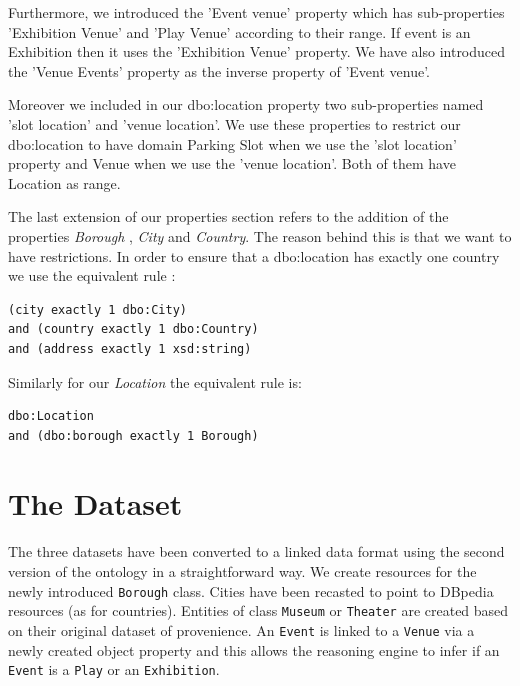 \documentclass[runningheads,a4paper]{../../StyleFiles/llncs}
\begin{document}
Furthermore, we introduced the 'Event venue' property which has sub-properties 'Exhibition Venue' and 'Play Venue' according to their range. If event is an Exhibition then it uses the 'Exhibition Venue' property. We have also introduced the 'Venue Events' property as the inverse property of 'Event venue'. 

Moreover we included in our dbo:location property two sub-properties named 'slot location' and 'venue location'. We use these properties to restrict our dbo:location to have domain Parking Slot when we use the 'slot location' property and Venue when we use the 'venue location'. Both of them have Location as range.

The last extension of our properties section refers to the addition of the properties \textit{Borough} , \textit{City} and \textit{Country}. The reason behind this is that we want to have restrictions. In order to ensure that a dbo:location has exactly one country we use the equivalent rule : 
\\

\begin{lstlisting}[captionpos=b, title=Class equivalent to dbo:Location with the use of our subproperties, label=lst:owl, basicstyle=\ttfamily\small,frame=bt]
(city exactly 1 dbo:City) 
and (country exactly 1 dbo:Country) 
and (address exactly 1 xsd:string)
\end{lstlisting}


Similarly for our \textit{Location} the equivalent rule is: 

\begin{lstlisting}[captionpos=b, title=Class equivalent to Location with the use of our subproperty orough, label=lst:owl, basicstyle=\ttfamily\small,frame=bt]
dbo:Location 
and (dbo:borough exactly 1 Borough)
\end{lstlisting}

\section{The Dataset}
The three datasets have been converted to a linked data format using the second
version of the ontology in a straightforward way. We create
resources for the newly introduced \texttt{Borough} class. Cities have been
recasted to point to DBpedia resources (as for countries).
Entities of class \texttt{Museum} or \texttt{Theater} are created based on their
original dataset of provenience. An \texttt{Event} is linked to a
\texttt{Venue} via a newly created object property and this allows the reasoning
engine to infer if an \texttt{Event} is a \texttt{Play} or an \texttt{Exhibition}.
\end{document}
